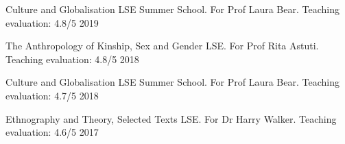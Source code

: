 
\begin{cvexperiences}
  \cvexperience
    {Culture and Globalisation} %
    {LSE Summer School. For Prof Laura Bear. Teaching evaluation: 4.8/5} %
    {2019} %

  \cvexperience
    {The Anthropology of Kinship, Sex and Gender} %
    {LSE. For Prof Rita Astuti. Teaching evaluation: 4.8/5} %
    {2018} %

  \cvexperience
    {Culture and Globalisation} %
    {LSE Summer School. For Prof Laura Bear. Teaching evaluation: 4.7/5} %
    {2018} %

  \cvexperience
    {Ethnography and Theory, Selected Texts} %
    {LSE. For Dr Harry Walker. Teaching evaluation: 4.6/5} %
    {2017} %

\end{cvexperiences}
